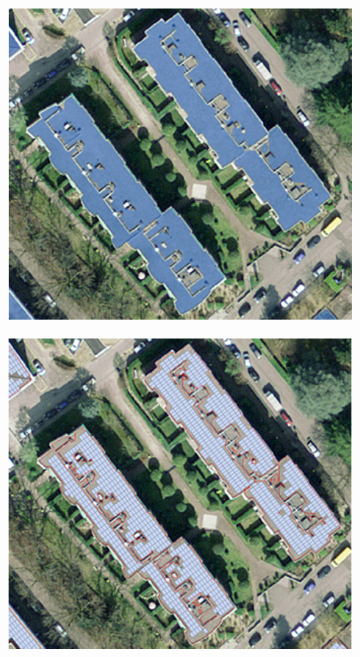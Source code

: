 \begin{figure}[tb]
\centering
\begin{subfigure}{.4\textwidth}
  \centering
  \includegraphics[width=\linewidth]{images/Figs/images1.png}
  \subcaption{}
  \label{figa:CNN_images}
\end{subfigure}
\begin{subfigure}{.4\textwidth}
  \centering
  \includegraphics[width=\linewidth]{images/Figs/images2.png}  

\end{subfigure}
\end{figure}
